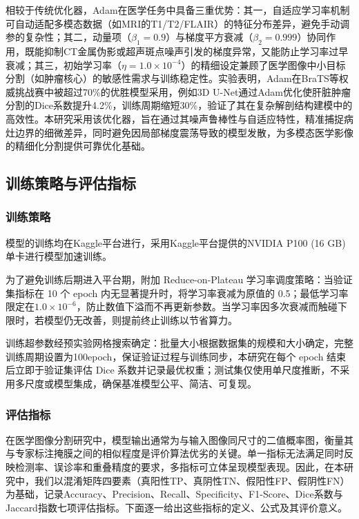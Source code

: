 相较于传统优化器，Adam在医学任务中具备三重优势：其一，自适应学习率机制可自动适配多模态数据（如MRI的T1/T2/FLAIR）的特征分布差异，避免手动调参的复杂性；其二，动量项（\( \beta_1=0.9 \)）与梯度平方衰减（\( \beta_2=0.999 \)）协同作用，既能抑制CT金属伪影或超声斑点噪声引发的梯度异常，又能防止学习率过早衰减；其三，初始学习率（\( \eta=1.0 \times 10^{-4} \)）的精细设定兼顾了医学图像中小目标分割（如肿瘤核心）的敏感性需求与训练稳定性。实验表明，Adam在BraTS等权威挑战赛中被超过70\%的优胜模型采用，例如3D U-Net通过Adam优化使肝脏肿瘤分割的Dice系数提升4.2\%，训练周期缩短30\%，验证了其在复杂解剖结构建模中的高效性。本研究采用该优化器，旨在通过其噪声鲁棒性与自适应特性，精准捕捉病灶边界的细微差异，同时避免因局部梯度震荡导致的模型发散，为多模态医学影像的精细化分割提供可靠优化基础。

\subsection{训练策略与评估指标}

\subsubsection{训练策略}

模型的训练均在Kaggle平台进行，采用Kaggle平台提供的NVIDIA P100 (16 GB) 单卡进行模型加速训练。

为了避免训练后期进入平台期，附加 Reduce-on-Plateau 学习率调度策略：当验证集指标在 10 个 epoch 内无显著提升时，将学习率衰减为原值的 0.5；最低学习率限定在$ 1.0 \times 10^{-6} $，防止数值下溢而不再更新参数。当学习率因多次衰减而触碰下限时，若模型仍无改善，则提前终止训练以节省算力。

训练超参数经预实验网格搜索确定：批量大小根据数据集的规模和大小确定，完整训练周期设置为100epoch，保证验证过程与训练同步，本研究在每个 epoch 结束后立即于验证集评估 Dice 系数并记录最优权重；测试集仅使用单尺度推断，不采用多尺度或模型集成，确保基准模型公平、简洁、可复现。

\subsubsection{评估指标}

在医学图像分割研究中，模型输出通常为与输入图像同尺寸的二值概率图，衡量其与专家标注掩膜之间的相似程度是评价算法优劣的关键。单一指标无法满足同时反映检测率、误诊率和重叠精度的要求，多指标可立体呈现模型表现。因此，在本研究中，我们以混淆矩阵四要素（真阳性TP、真阴性TN、假阳性FP、假阴性FN）为基础，记录Accuracy、Precision、Recall、Specificity、F1-Score、Dice系数与Jaccard指数七项评估指标。下面逐一给出这些指标的定义、公式及其评价意义。

